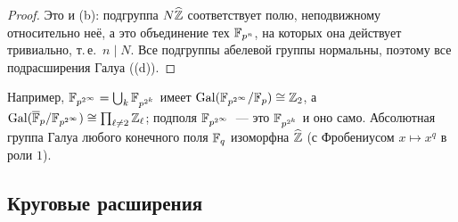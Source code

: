 \begin{proof}
Это  и (b): подгруппа $N\widehat{\mathbb Z}$ соответствует полю, неподвижному относительно неё, а это объединение тех
$\mathbb F_{p^n}$, на которых она действует тривиально, т.\,е.\ $n\mid N$. Все подгруппы абелевой группы нормальны, поэтому все
подрасширения Галуа ((d)).
\end{proof}

Например, $\mathbb F_{p^{2^\infty}}=\bigcup_k\mathbb F_{p^{2^k}}$ имеет $\operatorname{Gal}(\mathbb F_{p^{2^\infty}}/\mathbb F_p)\cong\mathbb Z_2$, а
$\operatorname{Gal}(\overline{\mathbb F}_p/\mathbb F_{p^{2^\infty}})\cong\prod_{\ell\ne2}\mathbb Z_\ell$; подполя $\mathbb F_{p^{2^\infty}}$~--- это $\mathbb F_{p^{2^k}}$ и оно само.
Абсолютная группа Галуа любого конечного поля $\mathbb F_q$ изоморфна $\widehat{\mathbb Z}$ (с Фробениусом $x\mapsto x^q$ в роли $1$).

\subsection*{Круговые расширения}

